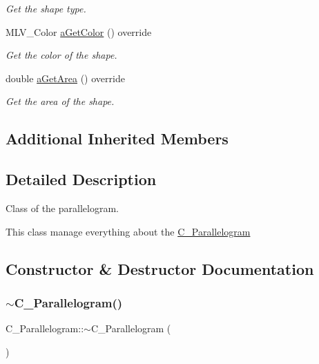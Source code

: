 \begin{DoxyCompactItemize}
\begin{DoxyCompactList}\small\item\em Get the shape type. \end{DoxyCompactList}\item 
M\+L\+V\+\_\+\+Color \hyperlink{classC__Parallelogram_afd5055e948fcd992be3cdd227c8b4bfb}{a\+Get\+Color} () override
\begin{DoxyCompactList}\small\item\em Get the color of the shape. \end{DoxyCompactList}\item 
double \hyperlink{classC__Parallelogram_a72b4509a33ee27331e5b9bdc8a3278e8}{a\+Get\+Area} () override
\begin{DoxyCompactList}\small\item\em Get the area of the shape. \end{DoxyCompactList}\end{DoxyCompactItemize}
\subsection*{Additional Inherited Members}


\subsection{Detailed Description}
Class of the parallelogram. 

This class manage everything about the \hyperlink{classC__Parallelogram}{C\+\_\+\+Parallelogram} 

\subsection{Constructor \& Destructor Documentation}
\mbox{\label{classC__Parallelogram_a2d7af48f3a26e8e07031e7c147a084a3}} 
\subsubsection{\texorpdfstring{$\sim$\+C\+\_\+\+Parallelogram()}{~C\_Parallelogram()}\hspace{0.1cm}{\footnotesize\ttfamily [1/2]}}
{\footnotesize\ttfamily C\+\_\+\+Parallelogram\+::$\sim$\+C\+\_\+\+Parallelogram (\begin{DoxyParamCaption}{ }\end{DoxyParamCaption})\hspace{0.3cm}{\ttfamily [override]}}



